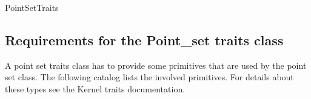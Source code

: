 \begin{ccRefConcept} {PointSetTraits}

\subsection{Requirements for the Point\_set traits class}

A point set traits class has to provide some primitives that are used by the point set class.
The following catalog lists the involved primitives.
For details about these types see the Kernel traits documentation.

\ccTypes

%
{ }

%
{ }

%
{ }

%
{ }

%
{ }	
	
%
{ }

%
{ }

%
{ }	
	
%
{ }

%
{ }

%
{ }

\end{ccRefConcept}
